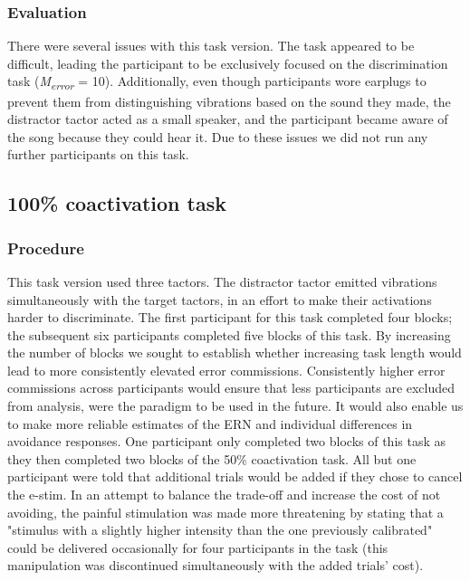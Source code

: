 \documentclass[twocolumn, serif, authordate, empirical]{jote-article}
\begin{document}
 {} \subsubsection*{Evaluation} There were several issues with this task version. The task appeared to be difficult, leading the participant to be exclusively focused on the discrimination task (\emph{M}\textsubscript{\emph{error}} = 10). Additionally, even though participants wore earplugs to prevent them from distinguishing vibrations based on the sound they made, the distractor tactor acted as a small speaker, and the participant became aware of the song because they could hear it. Due to these issues we did not run any further participants on this task.


 {} \subsection*{100\% coactivation task}

 {} \subsubsection*{Procedure} This task version used three tactors. The distractor tactor emitted vibrations simultaneously with the target tactors, in an effort to make their activations harder to discriminate. The first participant for this task completed four blocks; the subsequent six participants completed five blocks of this task. By increasing the number of blocks we sought to establish whether increasing task length would lead to more consistently elevated error commissions. Consistently higher error commissions across participants would ensure that less participants are excluded from analysis, were the paradigm to be used in the future. It would also enable us to make more reliable estimates of the ERN and individual differences in avoidance responses. One participant only completed two blocks of this task as they then completed two blocks of the 50\% coactivation task. All but one participant were told that additional trials would be added if they chose to cancel the e-stim. In an attempt to balance the trade-off and increase the cost of not avoiding, the painful stimulation was made more threatening by stating that a "stimulus with a slightly higher intensity than the one previously calibrated" could be delivered occasionally for four participants in the task (this manipulation was discontinued simultaneously with the added trials' cost).
\end{document}
